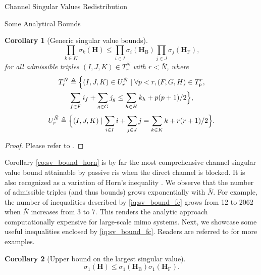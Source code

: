 \documentclass[journal]{IEEEtran}
\newtheorem{corollary}{Corollary}[proposition]
\begin{document}
\begin{section}{Channel Singular Values Redistribution}
\begin{subsection}{Some Analytical Bounds}
		\begin{corollary}[Generic singular value bounds\label{co:sv_bound_horn}]
			\begin{equation}
				\prod_{k \in {K}} \sigma_k(\mathbf{H}) \le \prod_{i \in {I}} \sigma_i(\mathbf{H}_\mathrm{B}) \prod_{j \in {J}} \sigma_j(\mathbf{H}_\mathrm{F}),
				\label{iq:sv_bound_fc}
			\end{equation}
			for all admissible triples $(I, J, K) \in T_r^{\bar{N}}$ with $r < \bar{N}$, where
			\begin{equation*}
				\begin{gathered}
					T_r^{\bar{N}} \triangleq \Bigl\{(I, J, K) \in U_r^{\bar{N}} \mid \forall p < r, (F, G, H) \in T_p^r,\\
					\sum_{f \in F} i_f + \sum_{g \in G} j_g \le \sum_{h \in H} k_h + p(p+1)/2 \Bigr\},
				\end{gathered}
			\end{equation*}
			\begin{equation*}
				U_r^{\bar{N}} \triangleq \Bigl\{(I, J, K) \mid \sum_{i \in I} i + \sum_{j \in J} j = \sum_{k \in K} k + r(r+1)/2\Bigr\}.
			\end{equation*}
		\end{corollary}

		\begin{proof}
			Please refer to \cite[Theorem~8]{Fulton2000}.
		\end{proof}

		Corollary \eqref{co:sv_bound_horn} is by far the most comprehensive channel singular value bound attainable by passive \gls{ris} when the direct channel is blocked.
		It is also recognized as a variation of Horn's inequality \cite{Bhatia2001}.
		We observe that the number of admissible triples (and thus bounds) grows exponentially with $\bar{N}$.
		For example, the number of inequalities described by \eqref{iq:sv_bound_fc} grows from 12 to 2062 when $\bar{N}$ increases from 3 to 7.
		This renders the analytic approach computationally expensive for large-scale \gls{mimo} systems.
		Next, we showcase some useful inequalities enclosed by \eqref{iq:sv_bound_fc}.
		Readers are referred to \cite[Chapter 16, 24]{Hogben2013} for more examples.

		\begin{corollary}[Upper bound on the largest singular value\label{co:sv_largest}]
			\begin{equation}
				\sigma_1(\mathbf{H}) \le \sigma_1(\mathbf{H}_\mathrm{B}) \sigma_1(\mathbf{H}_\mathrm{F}).
			\end{equation}
		\end{corollary}


\end{subsection}
\end{section}
\end{document}
